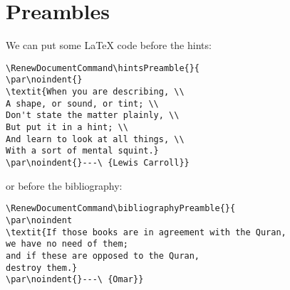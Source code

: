 \section{Preambles}
We can put some \LaTeX{} code before the hints:
\begin{Verbatim}[frame=leftline]
\RenewDocumentCommand\hintsPreamble{}{
\par\noindent{}
\textit{When you are describing, \\
A shape, or sound, or tint; \\
Don't state the matter plainly, \\
But put it in a hint; \\
And learn to look at all things, \\
With a sort of mental squint.}
\par\noindent{}---\ {Lewis Carroll}}
\end{Verbatim}
\RenewDocumentCommand{}
or before the bibliography:
\begin{Verbatim}[frame=leftline]
\RenewDocumentCommand\bibliographyPreamble{}{
\par\noindent
\textit{If those books are in agreement with the Quran,
we have no need of them;
and if these are opposed to the Quran,
destroy them.}
\par\noindent{}---\ {Omar}}
\end{Verbatim}
\RenewDocumentCommand{}

